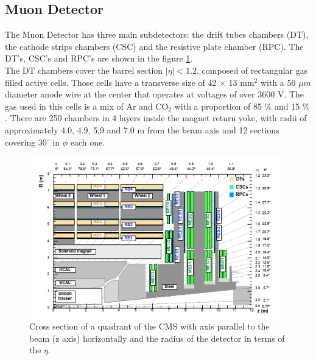 \subsection{Muon Detector}
The Muon Detector has three main subdetectors: the drift tubes chambers (DT), the cathode strips chambers (CSC) and the resistive plate chamber (RPC). 
The  DT's, CSC's and RPC's are shown in the figure \ref{dt}.
 \\
 
The DT chambers cover the barrel section $|\eta|<1.2$, composed of rectangular gas filled active cells. Those cells have a transverse size of 42 $\times$ 13 mm$^2$ with a 50 $\mu m$ diameter anode wire at the center that operates at voltages of over 3600 V. The gas used in this cells is a mix of Ar and CO$_2$ with a proportion of 85 $\%$ and 15 $\%$. There are 250 chambers in 4 layers inside the magnet return yoke, with radii of approximately 4.0, 4.9, 5.9 and 7.0 m from the beam axis  and 12 sections covering  30$^\circ$ in $\phi$ each one.
\\
\begin{figure}[!htbp]
	\centering
	\includegraphics[width=11cm,height=7cm]{Chapter2/csc}
	\caption{Cross section of a quadrant of the CMS with axis parallel to the beam (z axis) horizontally and the radius of the detector in terms of the $\eta$\cite{cms-manual}.}
	\label{dt}
\end{figure}

